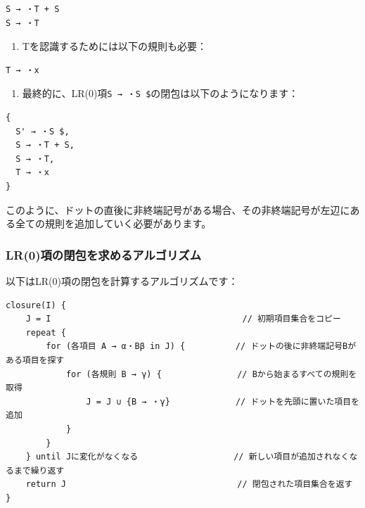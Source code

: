 \begin{verbatim}
S → ・T + S
S → ・T
\end{verbatim}

\begin{enumerate}
\def\labelenumi{\arabic{enumi}.}
\setcounter{enumi}{2}
\tightlist
\item
  Tを認識するためには以下の規則も必要：
\end{enumerate}

\begin{verbatim}
T → ・x
\end{verbatim}

\begin{enumerate}
\def\labelenumi{\arabic{enumi}.}
\setcounter{enumi}{3}
\tightlist
\item
  最終的に、LR(0)項\texttt{S\textquotesingle{}\ →\ ・S\ \$}の閉包は以下のようになります：
\end{enumerate}

\begin{verbatim}
{
  S' → ・S $,
  S → ・T + S,
  S → ・T,
  T → ・x
}
\end{verbatim}

このように、ドットの直後に非終端記号がある場合、その非終端記号が左辺にある全ての規則を追加していく必要があります。

\hypertarget{chapter5-lr0ux9805ux306eux9589ux5305ux3092ux6c42ux3081ux308bux30a2ux30ebux30b4ux30eaux30baux30e0}{%
\subsubsection{LR(0)項の閉包を求めるアルゴリズム}\label{chapter5-lr0ux9805ux306eux9589ux5305ux3092ux6c42ux3081ux308bux30a2ux30ebux30b4ux30eaux30baux30e0}}

以下はLR(0)項の閉包を計算するアルゴリズムです：

\begin{verbatim}
closure(I) {
    J = I                                      // 初期項目集合をコピー
    repeat {
        for (各項目 A → α・Bβ in J) {          // ドットの後に非終端記号Bがある項目を探す
            for (各規則 B → γ) {               // Bから始まるすべての規則を取得
                J = J ∪ {B → ・γ}             // ドットを先頭に置いた項目を追加
            }
        }
    } until Jに変化がなくなる                   // 新しい項目が追加されなくなるまで繰り返す
    return J                                  // 閉包された項目集合を返す
}
\end{verbatim}

